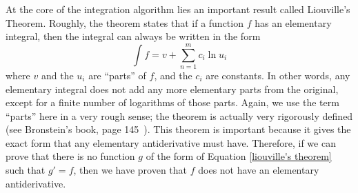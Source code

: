At the core of the \gls{integration} algorithm lies an important result
called Liouville's Theorem.  Roughly, the theorem states that if a
function $f$ has an \gls{elementary} integral, then the integral can
always be written in the form
\begin{equation}
\label{liouville's theorem}
\int{f} = v + \sum_{n=1}^m{c_i\ln{u_i}}
\end{equation}
where $v$ and the $u_i$ are ``parts'' of $f$, and the $c_i$ are
constants.  In other words, any \gls{elementary} integral does not add
any more \gls{elementary} parts from the original, except for a finite
number of logarithms of those parts.  Again, we use the term ``parts''
here in a very rough sense; the theorem is actually very rigorously
defined (see Bronstein's book, page 145~\cite{bronstein2005symbolic}). 
This theorem is important because it gives the exact form that any
\gls{elementary} antiderivative must have. Therefore, if we can prove that
there is no function $g$ of the form of Equation \ref{liouville's
theorem} such that $g'=f$, then we have proven that $f$ does not have an
\gls{elementary} antiderivative. 